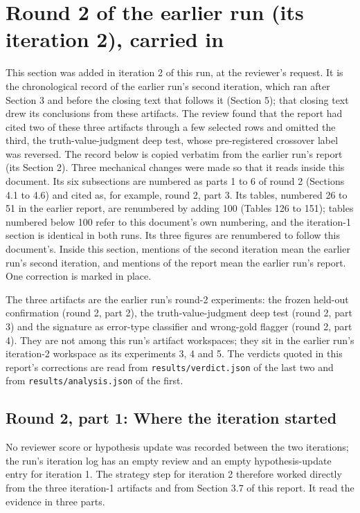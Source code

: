 \documentclass[11pt,letterpaper]{article}
\begin{document}
\section{Round 2 of the earlier run (its iteration 2), carried in}

This section was added in iteration 2 of this run, at the reviewer's request. It is the chronological record of the earlier run's second iteration, which ran after Section 3 and before the closing text that follows it (Section 5); that closing text drew its conclusions from these artifacts. The review found that the report had cited two of these three artifacts through a few selected rows and omitted the third, the truth-value-judgment deep test, whose pre-registered crossover label was reversed. The record below is copied verbatim from the earlier run's report (its Section 2). Three mechanical changes were made so that it reads inside this document. Its six subsections are numbered as parts 1 to 6 of round 2 (Sections 4.1 to 4.6) and cited as, for example, round 2, part 3. Its tables, numbered 26 to 51 in the earlier report, are renumbered by adding 100 (Tables 126 to 151); tables numbered below 100 refer to this document's own numbering, and the iteration-1 section is identical in both runs. Its three figures are renumbered to follow this document's. Inside this section, mentions of the second iteration mean the earlier run's second iteration, and mentions of the report mean the earlier run's report. One correction is marked in place.

The three artifacts are the earlier run's round-2 experiments: the frozen held-out confirmation (round 2, part 2), the truth-value-judgment deep test (round 2, part 3) and the signature as error-type classifier and wrong-gold flagger (round 2, part 4). They are not among this run's artifact workspaces; they sit in the earlier run's iteration-2 workspace as its experiments 3, 4 and 5. The verdicts quoted in this report's corrections are read from \texttt{results/\allowbreak{}verdict.json} of the last two and from \texttt{results/\allowbreak{}analysis.json} of the first.

\subsection{Round 2, part 1: Where the iteration started}

No reviewer score or hypothesis update was recorded between the two iterations; the run's iteration log has an empty review and an empty hypothesis-update entry for iteration 1. The strategy step for iteration 2 therefore worked directly from the three iteration-1 artifacts and from Section 3.7 of this report. It read the evidence in three parts.
\end{document}
